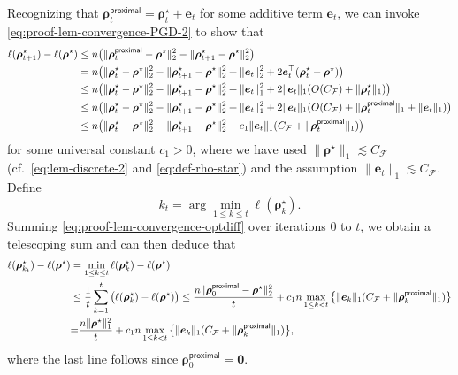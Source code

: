 \documentclass[english]{article}
\begin{document}
Recognizing that ${\bm \rho}_{t}^{\mathsf{proximal}} = {\bm \rho}_t^{\star} + {\bm e}_t$ for some additive term $\bm{e}_t$, we can invoke \eqref{eq:proof-lem-convergence-PGD-2} to show that
%
\begin{align}\label{eq:proof-lem-convergence-optdiff}
\ell({\bm \rho}_{t+1}^{\star}) - \ell({\bm \rho}^{\star}) 
&\le n\big(\|{\bm \rho}_t^{\mathsf{proximal}} - {\bm \rho}^{\star}\|_2^2 - \|{\bm \rho}_{t+1}^{\star} - {\bm \rho}^{\star}\|_2^2 \big) \notag\\
&= n\big(\|{\bm \rho}_t^{\star} - {\bm \rho}^{\star}\|_2^2 - \|{\bm \rho}_{t+1}^{\star} - {\bm \rho}^{\star}\|_2^2 + \|{\bm e}_t\|_2^2 
+ 2\bm{e}_t^{\top} (\bm{\rho}_t^{\star} - \bm{\rho}^{\star}) \big) \notag\\
&\le n\big(\|{\bm \rho}_t^{\star} - {\bm \rho}^{\star}\|_2^2 - \|{\bm \rho}_{t+1}^{\star} - {\bm \rho}^{\star}\|_2^2 + \|{\bm e}_t\|_1^2 + 2\|{\bm e}_t\|_1(O(C_{\mathcal{F}})+\|{\bm \rho}_t^{\star}\|_1)\big)\notag\\
&\le n\big(\|{\bm \rho}_t^{\star} - {\bm \rho}^{\star}\|_2^2 - \|{\bm \rho}_{t+1}^{\star} - {\bm \rho}^{\star}\|_2^2 +  \|{\bm e}_t\|_1^2 +2\|{\bm e}_t\|_1(O(C_{\mathcal{F}})+\|{\bm \rho}_t^{\mathsf{proximal}}\|_1 + \|{\bm e}_t\|_1)\big)\notag\\
&\le n\big(\|{\bm \rho}_t^{\star} - {\bm \rho}^{\star}\|_2^2 - \|{\bm \rho}_{t+1}^{\star} - {\bm \rho}^{\star}\|_2^2   +c_1\|{\bm e}_t\|_1(C_{\mathcal{F}}+\|{\bm \rho}_t^{\mathsf{proximal}}\|_1)\big)
\end{align}
%
for some universal constant $c_1>0$, where we have used  $\|{\bm \rho}^{\star}\|_1\lesssim C_{\mathcal{F}}$ (cf.~\eqref{eq:lem-discrete-2} and \eqref{eq:def-rho-star}) and the assumption $\|{\bm e}_t\|_1\lesssim C_{\mathcal{F}}$.
Define
$$
k_t = \arg\min_{1\le k\le t} \ell({\bm \rho}_k^{\star}).
$$
Summing \eqref{eq:proof-lem-convergence-optdiff} over iterations $0$ to $t$, we obtain a telescoping sum and can then deduce that
%
\begin{align}\label{eq:proof-lem-convergence-lrhostar}
\ell({\bm \rho}_{k_t}^{\star}) - \ell({\bm \rho}^{\star})  &= \min_{1\le k\le t}\ell({\bm \rho}_k^{\star}) - \ell({\bm \rho}^{\star})\notag\\ 
&\le 
\frac{1}{t}\sum_{k=1}^t \big( \ell({\bm \rho}_k^{\star}) - \ell({\bm \rho}^{\star}) \big) \le \frac{n\|{\bm \rho}_0^{\mathsf{proximal}} - {\bm \rho}^{\star}\|_2^2}{t} + c_1n\max_{1\le k< t} \big\{\|{\bm e}_k\|_1(C_{\mathcal{F}}+\|{\bm \rho}_k^{\mathsf{proximal}}\|_1) \big\}\notag\\
&{=} \frac{n\|{\bm \rho}^{\star}\|_1^2}{t} + c_1n\max_{1\le k< t}\big\{\|{\bm e}_k\|_1(C_{\mathcal{F}}+\|{\bm \rho}_k^{\mathsf{proximal}}\|_1)\big\},
\end{align}
%
where the last line follows since ${\bm \rho}_0^{\mathsf{proximal}} = {\bm 0}$.
\end{document}
